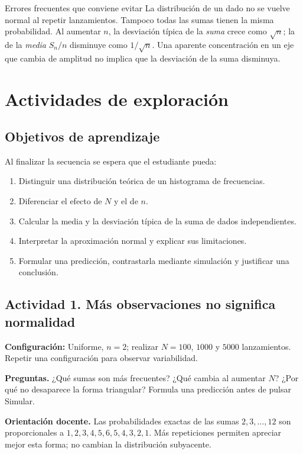 \documentclass[11pt,a4paper]{article}
\begin{document}
\begin{nota}{Errores frecuentes que conviene evitar}
La distribución de un dado no se vuelve normal al repetir lanzamientos. Tampoco todas las sumas tienen la misma probabilidad. Al aumentar $n$, la desviación típica de la \emph{suma} crece como $\sqrt n$; la de la \emph{media} $S_n/n$ disminuye como $1/\sqrt n$. Una aparente concentración en un eje que cambia de amplitud no implica que la desviación de la suma disminuya.
\end{nota}

\clearpage\section{Actividades de exploración}
\subsection{Objetivos de aprendizaje}
Al finalizar la secuencia se espera que el estudiante pueda:
\begin{enumerate}[label=O\arabic*.]
\item Distinguir una distribución teórica de un histograma de frecuencias.
\item Diferenciar el efecto de $N$ y el de $n$.
\item Calcular la media y la desviación típica de la suma de dados independientes.
\item Interpretar la aproximación normal y explicar sus limitaciones.
\item Formular una predicción, contrastarla mediante simulación y justificar una conclusión.
\end{enumerate}

\subsection{Actividad 1. Más observaciones no significa normalidad}
\textbf{Configuración:} Uniforme, $n=2$; realizar $N=100$, $1000$ y $5000$ lanzamientos. Repetir una configuración para observar variabilidad.

\textbf{Preguntas.} ¿Qué sumas son más frecuentes? ¿Qué cambia al aumentar $N$? ¿Por qué no desaparece la forma triangular? Formula una predicción antes de pulsar Simular.

\textbf{Orientación docente.} Las probabilidades exactas de las sumas $2,3,\ldots,12$ son proporcionales a $1,2,3,4,5,6,5,4,3,2,1$. Más repeticiones permiten apreciar mejor esta forma; no cambian la distribución subyacente.
\end{document}
